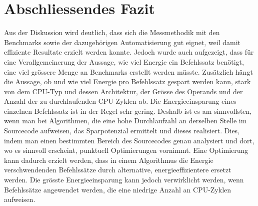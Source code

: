 \section{Abschliessendes Fazit}
Aus der Diskussion wird deutlich, dass sich die Messmethodik mit den Benchmarks sowie der dazugehörigen Automatisierung gut eignet, weil damit effiziente Resultate erzielt werden konnte. Jedoch wurde auch aufgezeigt, dass für eine Verallgemeinerung der Aussage, wie viel Energie ein Befehlssatz benötigt, eine viel grössere Menge an Benchmarks erstellt werden müsste. Zusätzlich hängt die Aussage, ob und wie viel Energie pro Befehlssatz gespart werden kann, stark von dem CPU-Typ und dessen Architektur, der Grösse des Operands und der Anzahl der zu durchlaufenden CPU-Zyklen ab. Die Energieeinsparung eines einzelnen Befehlssatz ist in der Regel sehr gering. Deshalb ist es am sinnvollsten, wenn man bei Algorithmen, die eine hohe Durchlaufzahl an derselben Stelle im Sourcecode aufweisen, das Sparpotenzial ermittelt und dieses realisiert. Dies, indem man einen bestimmten Bereich des Sourcecodes genau analysiert und dort, wo es sinnvoll erscheint, punktuell Optimierungen vornimmt. Eine Optimierung kann dadurch erzielt werden, dass in einem Algorithmus die Energie verschwendenden Befehlssätze durch alternative, energieeffizientere ersetzt werden. Die grösste Energieeinsparung kann jedoch verwirklicht werden, wenn Befehlssätze angewendet werden, die eine niedrige Anzahl an CPU-Zyklen aufweisen. 
